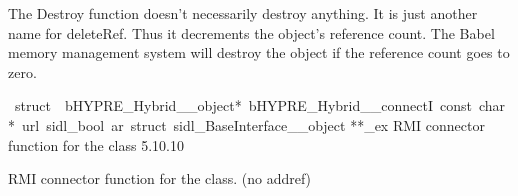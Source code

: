 \documentclass{article}
\begin{document}
\begin{cxxentry}
\begin{cxxentry}
\begin{cxxfunction}
\begin{cxxdoc}
The Destroy function doesn't necessarily destroy anything.
It is just another name for deleteRef.  Thus it decrements the
object's reference count.  The Babel memory management system will
destroy the object if the reference count goes to zero.
\end{cxxdoc}
\end{cxxfunction}
\begin{cxxvariable}
{\ struct\ \ bHYPRE\_Hybrid\_\_object*\ bHYPRE\_Hybrid\_\_connectI\ const\ char\ *\ url\ sidl\_bool\ ar\ struct\ sidl\_BaseInterface\_\_object}
        {**\_ex}
        {}
        {
RMI connector function for the class}
        {5.10.10}
\begin{cxxdoc}

RMI connector function for the class. (no addref)
\end{cxxdoc}
\end{cxxvariable}
\end{cxxentry}
\end{cxxentry}
\end{document}
